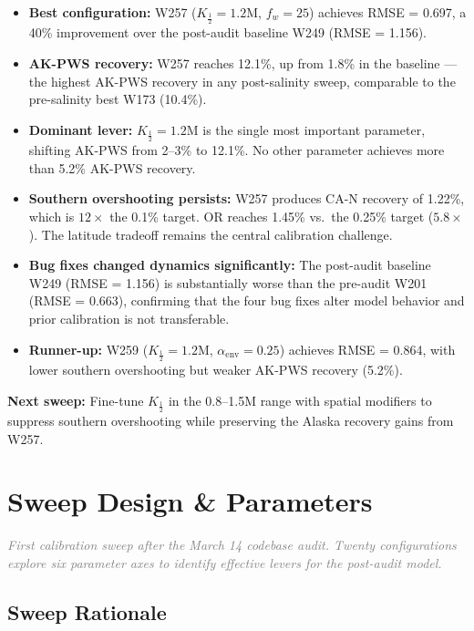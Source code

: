 \documentclass[11pt,a4paper,oneside]{article}
\newcommand{\sectionintro}[1]{%
    \noindent\textcolor{graytext}{\textit{#1}}\par\medskip
}
\begin{document}
\begin{itemize}[nosep]
    \item \textbf{Best configuration:} W257 ($K_{\frac{1}{2}} = 1.2\text{M}$, $f_w = 25$) achieves RMSE = 0.697, a 40\% improvement over the post-audit baseline W249 (RMSE = 1.156).
    \item \textbf{AK-PWS recovery:} W257 reaches 12.1\%, up from 1.8\% in the baseline --- the highest AK-PWS recovery in any post-salinity sweep, comparable to the pre-salinity best W173 (10.4\%).
    \item \textbf{Dominant lever:} $K_{\frac{1}{2}} = 1.2\text{M}$ is the single most important parameter, shifting AK-PWS from 2--3\% to 12.1\%. No other parameter achieves more than 5.2\% AK-PWS recovery.
    \item \textbf{Southern overshooting persists:} W257 produces CA-N recovery of 1.22\%, which is $12\times$ the 0.1\% target. OR reaches 1.45\% vs.\ the 0.25\% target ($5.8\times$). The latitude tradeoff remains the central calibration challenge.
    \item \textbf{Bug fixes changed dynamics significantly:} The post-audit baseline W249 (RMSE = 1.156) is substantially worse than the pre-audit W201 (RMSE = 0.663), confirming that the four bug fixes alter model behavior and prior calibration is not transferable.
    \item \textbf{Runner-up:} W259 ($K_{\frac{1}{2}} = 1.2\text{M}$, $\alpha_{\text{env}} = 0.25$) achieves RMSE = 0.864, with lower southern overshooting but weaker AK-PWS recovery (5.2\%).
\end{itemize}

\noindent\textbf{Next sweep:} Fine-tune $K_{\frac{1}{2}}$ in the 0.8--1.5M range with spatial modifiers to suppress southern overshooting while preserving the Alaska recovery gains from W257.

\clearpage

\section{Sweep Design \& Parameters}

\sectionintro{First calibration sweep after the March 14 codebase audit. Twenty configurations explore six parameter axes to identify effective levers for the post-audit model.}

\subsection{Sweep Rationale}
\end{document}

